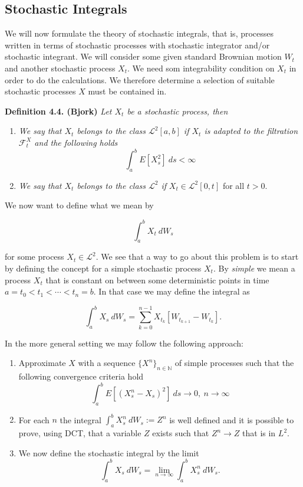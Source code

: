 \documentclass[a4paper,12pt,openany]{book}
\providecommand{\tightlist}{%
 \setlength{\itemsep}{0pt}\setlength{\parskip}{0pt}}
\begin{document}
\hypertarget{stochastic-integrals-1}{%
\subsection{Stochastic Integrals}\label{stochastic-integrals-1}}

We will now formulate the theory of stochastic integrals, that is, processes written in terms of stochastic processes with stochastic integrator and/or stochastic integrant. We will consider some given standard Brownian motion \(W_t\) and another stochastic process \(X_t\). We need som integrability condition on \(X_t\) in order to do the calculations. We therefore determine a selection of suitable stochastic processes \(X\) must be contained in.

\textbf{Definition 4.4. (Bjork)} \emph{Let \(X_t\) be a stochastic process, then}

\begin{enumerate}
\def\labelenumi{\roman{enumi}.}
\tightlist
\item
  \emph{We say that \(X_t\) belongs to the class \(\mathcal{L}^2[a,b]\) if \(X_t\) is adapted to the filtration \(\mathcal{F}^X_t\) and the following holds}
  \[\int_a^bE[X_s^2]\ ds<\infty\]
\item
  \emph{We say that \(X_t\) belongs to the class \(\mathcal{L}^2\) if} \(X_t\in\mathcal{L}^2[0,t]\) for all \(t>0\).
\end{enumerate}

We now want to define what we mean by

\[
\int_a^bX_t\ dW_s
\]

for some process \(X_t\in\mathcal{L}^2\). We see that a way to go about this problem is to start by defining the concept for a simple stochastic process \(X_t\). By \emph{simple} we mean a process \(X_t\) that is constant on between some deterministic points in time \(a=t_0<t_1<\cdots<t_n=b\). In that case we may define the integral as

\[
\int_a^bX_s\ dW_s = \sum_{k=0}^{n-1}X_{t_k}[W_{t_{k+1}}-W_{t_k}].\tag{4.8}
\]

In the more general setting we may follow the following approach:

\begin{enumerate}
\def\labelenumi{\arabic{enumi}.}
\tightlist
\item
  Approximate \(X\) with a sequence \(\{X^n\}_{n\in\mathbb{N}}\) of simple processes such that the following convergence criteria hold
  \[
    \int_a^bE[(X_s^n-X_s)^2]\ ds\to 0,\ n\to\infty
    \]
\item
  For each \(n\) the integral \(\int_a^b X_s^n\ dW_s:=Z^n\) is well defined and it is possible to prove, using DCT, that a variable \(Z\) exists such that \(Z^n\to Z\) that is in \(L^2\).
\item
  We now define the stochastic integral by the limit
  \[
    \int_a^b X_s\ dW_s=\lim_{n\to \infty}\int_a^b X_s^n\ dW_s.\tag{4.9}
    \]
\end{enumerate}
\end{document}
